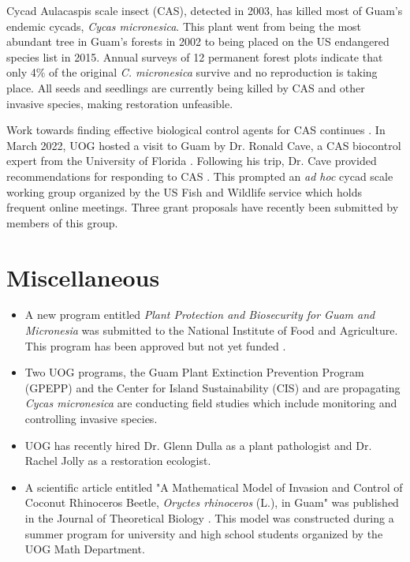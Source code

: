 \documentclass[twocolumn]{scrartcl}
\begin{document}
Cycad Aulacaspis scale insect (CAS), detected in 2003, has killed most of Guam’s endemic cycads, \textit{Cycas micronesica}. This plant went from being the
most abundant tree in Guam’s forests in 2002 to being placed on the US endangered species list in 2015. Annual surveys of 12 permanent forest
plots indicate that only 4\% of the original \textit{C. micronesica} survive and no reproduction is taking place. All seeds and seedlings are currently being killed by CAS and other invasive species, making restoration unfeasible. 

Work towards finding effective biological control agents for CAS continues \cite{caveBiologicalControlCycad2022}. In March 2022, UOG hosted a visit to Guam by Dr. Ronald Cave, a CAS biocontrol expert from the University of Florida \cite{caveBiologicalControlCycad2022a}. Following his trip, Dr. Cave provided recommendations for responding to CAS \cite{caveReportUSFish2022}. This prompted an \textit{ad hoc} cycad scale working group organized by the US Fish and Wildlife service which holds frequent online meetings. Three grant proposals have recently been submitted by members of this group.

\section{Miscellaneous}

\begin{itemize}
	\item A new program entitled \textit{Plant Protection and Biosecurity for Guam and Micronesia} was submitted to the National Institute of Food and Agriculture. This program has been approved but not yet funded \cite{NIFA2022}.

	\item Two UOG programs, the Guam Plant Extinction Prevention Program (GPEPP) and the Center for Island Sustainability (CIS) and are propagating \textit{Cycas micronesica} are conducting field studies which include monitoring and controlling invasive species. 
	
	\item UOG has recently hired Dr. Glenn Dulla as a plant pathologist and Dr. Rachel Jolly as a restoration ecologist.
	
	\item A scientific article entitled "A Mathematical Model of Invasion and Control of Coconut Rhinoceros Beetle, \textit{Oryctes rhinoceros} (L.), in Guam" was published in the Journal of Theoretical Biology \cite{caasiMathematicalModelInvasion2023}. This model was  constructed during a summer program for university and high school students organized by the UOG Math Department. 
	
\end{itemize}

\printbibliography
\end{document}
